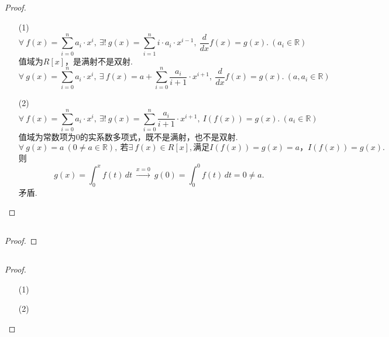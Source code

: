 \documentclass[UTF8]{ctexart}
\begin{document}
\subsection{}   %
\begin{proof}
    \begin{enumerate}
        \item []
        \item [(1)]
        \[
            \forall\ f(x)=\sum\limits_{i=0}^{n} a_i\cdot x^i,\ 
            \exists !\ g(x)=\sum\limits_{i=1}^{n} i\cdot a_i \cdot x^{i-1},\ 
            \frac{d}{dx}f(x)=g(x).\ (a_i \in\mathbb{R})
        \]
        值域为$R[x]$，是满射不是双射.
        \[
            \forall\ g(x)=\sum\limits_{i=0}^{n} a_i\cdot x^i,\ 
            \exists\ f(x)=a+\sum\limits_{i=0}^{n} \frac{a_i}{i+1} \cdot x^{i+1},\ 
            \frac{d}{dx}f(x)=g(x).\ (a,a_i \in\mathbb{R})
        \]
        \item [(2)]
        \[
            \forall\ f(x)=\sum\limits_{i=0}^{n} a_i\cdot x^i,\ 
            \exists !\ g(x)=\sum\limits_{i=0}^{n} \frac{a_i}{i+1} \cdot x^{i+1},\ 
            I(f(x))=g(x).\ (a_i \in\mathbb{R})
        \]
        值域为常数项为0的实系数多项式，既不是满射，也不是双射.
        \[
            \forall\ g(x)=a\ (0\neq a\in\mathbb{R}),\ 
            \mbox{若}\exists\ f(x)\in R[x],\mbox{满足} I(f(x))=g(x)=a，
            I(f(x))=g(x).
        \]
        则
        \[
            g(x) = \int_{0}^{x} f(t) \,dt  
            \ \xrightarrow{x=0}\ 
            g(0) = \int_{0}^{0} f(t) \,dt = 0 \neq a.  
        \]
        矛盾.
    \end{enumerate}
\end{proof}

\subsection{}   %
\begin{proof}
    
\end{proof}

\subsection{}   %
\begin{proof}
    \begin{enumerate}
        \item []
        \item [(1)]
        \item [(2)]
    \end{enumerate}
\end{proof}
\end{document}
